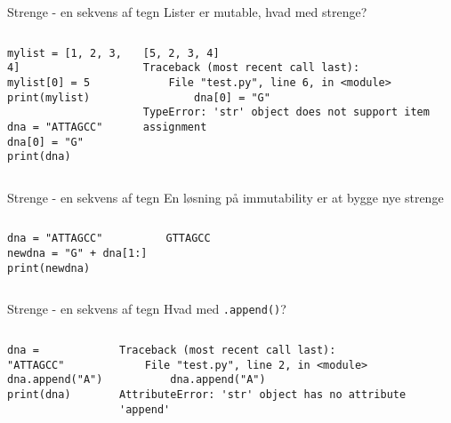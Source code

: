 \documentclass[main.tex]{subfiles}
\begin{document}
\begin{frame}[fragile]{Strenge - en sekvens af tegn}
	Lister er mutable, hvad med strenge?
	\begin{columns}
			\begin{lstlisting}[style=python]
mylist = [1, 2, 3, 4]
mylist[0] = 5
print(mylist)

dna = "ATTAGCC"
dna[0] = "G"
print(dna)
			\end{lstlisting}
		
		\pause
			\begin{lstlisting}[style=python]
[5, 2, 3, 4]
Traceback (most recent call last):
	File "test.py", line 6, in <module>
		dna[0] = "G"
TypeError: 'str' object does not support item assignment
			\end{lstlisting}
	\end{columns}
\end{frame}


\begin{frame}[fragile]{Strenge - en sekvens af tegn}
	En løsning på immutability er at bygge nye strenge
		\begin{columns}
		\column{0.4\textwidth}
		\begin{lstlisting}[style=python]
dna = "ATTAGCC"
newdna = "G" + dna[1:]
print(newdna)
		\end{lstlisting}
		
		\pause
		\column{0.4\textwidth}
		\begin{lstlisting}[style=python]
GTTAGCC
		\end{lstlisting}
	\end{columns}
\end{frame}

\begin{frame}[fragile]{Strenge - en sekvens af tegn}
	Hvad med \texttt{.append()}?
	\begin{columns}
		\begin{lstlisting}[style=python]
dna = "ATTAGCC"
dna.append("A")
print(dna)
		\end{lstlisting}
		
		\pause
		\begin{lstlisting}[style=python]
Traceback (most recent call last):
	File "test.py", line 2, in <module>
		dna.append("A")
AttributeError: 'str' object has no attribute 'append'
		\end{lstlisting}
	\end{columns}
\end{frame}
\end{document}
